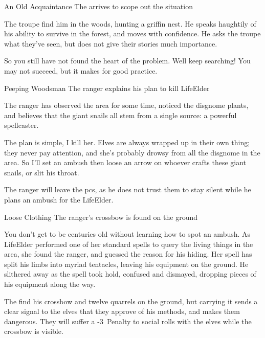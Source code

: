 {An Old Acquaintance}%
{The  arrives to scope out the situation}%

The troupe find him in the woods, hunting a griffin nest.
He speaks haughtily of his ability to survive in the forest, and moves with confidence.
He asks the troupe what they've seen, but does not give their stories much importance.

\begin{speechtext}
  So you still have not found the heart of the problem.
  Well keep searching!
  You may not succeed, but it makes for good practice.
\end{speechtext}

{Peeping Woodsman}%
{The ranger explains his plan to kill \gls{LifeElder}}%

The \gls{ranger} has observed the area for some time, noticed the \gls{disgnome} plants, and believes that the giant snails all stem from a single source: a powerful spellcaster.

\begin{speechtext}
  The plan is simple, I kill her.
  Elves are always wrapped up in their own thing; they never pay attention, and she's probably drowsy from all the \gls{disgnome} in the area.
  So I'll set an ambush then loose an arrow on whoever crafts these giant snails, or slit his throat.
\end{speechtext}

The \gls{ranger} will leave the \glspl{pc}, as he does not trust them to stay silent while he plans an ambush for the \gls{LifeElder}.

{Loose Clothing}%
{The ranger's crossbow is found on the ground}%

\begin{speechtext}
  You don't get to be centuries old without learning how to spot an ambush.
  As \gls{LifeElder} performed one of her standard spells to query the living things in the area, she found the ranger, and guessed the reason for his hiding.
  Her spell has split his limbs into myriad tentacles, leaving his equipment on the ground.
  He slithered away as the spell took hold, confused and dismayed, dropping pieces of his equipment along the way.
\end{speechtext}

The find his crossbow and twelve quarrels on the ground, but carrying it sends a clear signal to the elves that they approve of his methods, and makes them dangerous.
They will suffer a -3~Penalty to social rolls with the elves while the crossbow is visible.

